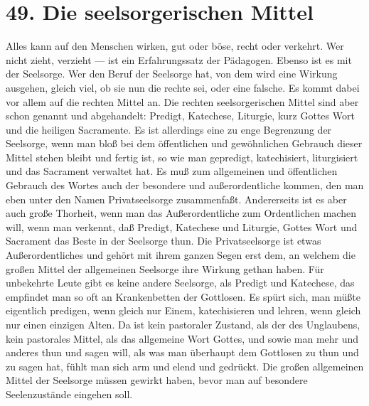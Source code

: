 \section{49. Die seelsorgerischen Mittel}

Alles kann auf den Menschen wirken, gut oder böse, recht oder verkehrt. Wer nicht zieht, verzieht — ist ein Erfahrungssatz der Pädagogen. Ebenso ist es mit der Seelsorge. Wer den Beruf der Seelsorge hat, von dem wird eine Wirkung ausgehen, gleich viel, ob sie nun die rechte sei, oder eine falsche. Es kommt dabei vor allem auf die rechten Mittel an. Die rechten seelsorgerischen Mittel sind aber schon genannt und abgehandelt: Predigt, Katechese, Liturgie, kurz Gottes Wort und die heiligen Sacramente. Es ist allerdings eine zu enge Begrenzung der Seelsorge, wenn man bloß bei dem öffentlichen und gewöhnlichen Gebrauch dieser Mittel stehen bleibt und fertig ist, so wie man gepredigt, katechisiert, liturgisiert und das Sacrament verwaltet hat. Es muß zum allgemeinen und öffentlichen Gebrauch des Wortes auch der besondere und außerordentliche kommen, den man eben unter den Namen Privatseelsorge zusammenfaßt. Andererseits ist es aber auch große Thorheit, wenn man das Außerordentliche zum Ordentlichen machen will, wenn man verkennt, daß Predigt, Katechese und Liturgie, Gottes Wort und Sacrament das Beste in der
Seelsorge thun. Die Privatseelsorge ist etwas Außerordentliches und gehört mit ihrem ganzen Segen erst dem, an welchem die großen Mittel der allgemeinen Seelsorge ihre Wirkung gethan haben. Für unbekehrte Leute gibt es keine andere Seelsorge, als Predigt und Katechese, das empfindet man so oft an Krankenbetten der Gottlosen. Es spürt sich, man müßte eigentlich predigen, wenn gleich nur Einem, katechisieren und lehren, wenn gleich nur einen einzigen Alten. Da ist kein pastoraler Zustand, als der des Unglaubens, kein pastorales Mittel, als das allgemeine Wort Gottes, und sowie man mehr und anderes thun und sagen will, als was man überhaupt dem Gottlosen zu thun und zu sagen hat, fühlt man sich arm und elend und gedrückt. Die großen allgemeinen Mittel der Seelsorge müssen gewirkt haben, bevor man auf besondere Seelenzustände eingehen soll.

